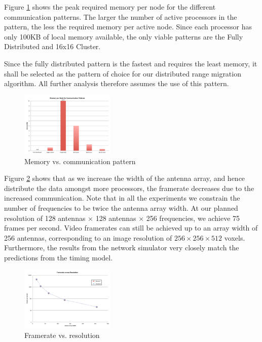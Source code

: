 \documentclass[twocolumn]{article}
\begin{document}
Figure \ref{mem vs comm pattern} shows the peak required memory per node for the different communication patterns. The larger the number of active processors in the pattern, the less the required memory per active node. Since each processor has only 100KB of local memory available, the only viable patterns are the Fully Distributed and 16x16 Cluster. 

Since the fully distributed pattern is the fastest and requires the least memory, it shall be selected as the pattern of choice for our distributed range migration algorithm. All further analysis therefore assumes the use of this pattern.

\begin{figure}[!h]
\centering
\includegraphics*[width=0.4\textwidth]{figures/chart6.pdf}
\caption{Memory vs. communication pattern}
\label{mem vs comm pattern}
\end{figure}

Figure \ref{framerate vs resolution} shows that as we increase the width of the antenna array, and hence distribute the data amongst more processors, the framerate decreases due to the increased communication. Note that in all the experiments  we constrain the number of frequencies to be twice the antenna array width. At our planned resolution of 128 antennas $\times$ 128 antennas $\times$ 256 frequencies, we achieve 75 frames per second. Video framerates can still be achieved up to an array width of 256 antennas, corresponding to an image resolution of $256\times256\times512$ voxels. Furthermore, the results from the network simulator very closely match the predictions from the timing model.

\begin{figure}[!h]
\centering
\includegraphics*[width=0.4\textwidth]{figures/chart7.pdf}
\caption{Framerate vs. resolution}
\label{framerate vs resolution}
\end{figure}
\end{document}
